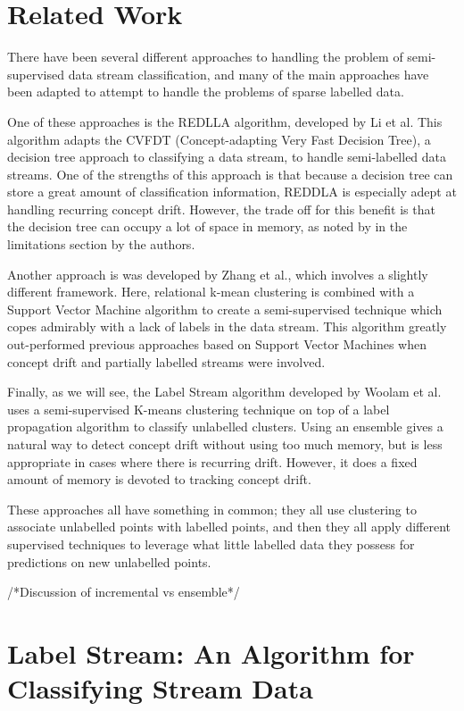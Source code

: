 \documentclass[12pt,a4paper,oneside]{report}
\begin{document}
\section*{Related Work}

There have been several different approaches to handling the problem of semi-supervised data stream classification, and many of the main approaches have been adapted to attempt to handle the problems of sparse labelled data. 

One of these approaches is the REDLLA algorithm, developed by Li et al\cite{Li}. This algorithm adapts the CVFDT (Concept-adapting Very Fast Decision Tree)\cite{CVFDT}, a decision tree approach to classifying a data stream, to handle semi-labelled data streams. One of the strengths of this approach is that because a decision tree can store a great amount of classification information, REDDLA is especially adept at handling recurring concept drift. However, the trade off for this benefit is that the decision tree can occupy a lot of space in memory, as noted by in the limitations section by the authors. 

Another approach is was developed by Zhang et al.\cite{Zhang}, which involves a slightly different framework. Here, relational k-mean clustering is combined with a Support Vector Machine algorithm to create a semi-supervised technique which copes admirably with a lack of labels in the data stream. This algorithm greatly out-performed previous approaches based on Support Vector Machines when concept drift and partially labelled streams were involved. 

Finally, as we will see, the Label Stream algorithm developed by Woolam et al. \cite{LabStr} uses a semi-supervised K-means clustering technique on top of a label propagation algorithm to classify unlabelled clusters. Using an ensemble gives a natural way to detect concept drift without using too much memory, but is less appropriate in cases where there is recurring drift. However, it does a fixed amount of memory is devoted to tracking concept drift. 

These approaches all have something in common; they all use clustering to associate unlabelled points with labelled points, and then they all apply different supervised techniques to leverage what little labelled data they possess for predictions on new unlabelled points. 

/*Discussion of incremental vs ensemble*/
\section*{Label Stream: An Algorithm for Classifying Stream Data}
\end{document}
